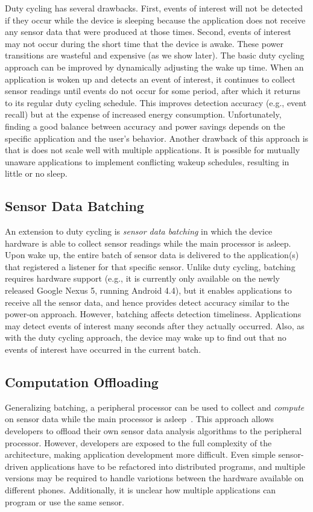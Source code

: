 Duty cycling has several drawbacks. First, events of interest will not be
detected if they occur while the device is sleeping because the application does
not receive any sensor data that were produced at those times. Second, events of
interest may not occur during the short time that the device is awake. These
power transitions are wasteful and expensive (as we show later). The basic duty
cycling approach can be improved by dynamically adjusting the wake up time. When
an application is woken up and detects an event of interest, it continues to
collect sensor readings until events do not occur for some period, after which
it returns to its regular duty cycling schedule. This improves detection
accuracy (e.g., event recall) but at the expense of increased energy
consumption. Unfortunately, finding a good balance between accuracy and power
savings depends on the specific application and the user's behavior. Another
drawback of this approach is that is does not scale well with multiple
applications. It is possible for mutually unaware applications to implement
conflicting wakeup schedules, resulting in little or no sleep.

\subsection{Sensor Data Batching}

An extension to duty cycling is \emph{sensor data batching} in which the device
hardware is able to collect sensor readings while the main processor is
asleep. Upon wake up, the entire batch of sensor data is delivered to the
application(s) that registered a listener for that specific sensor. Unlike duty
cycling, batching requires hardware support (e.g., it is currently only
available on the newly released Google Nexus 5, running Android 4.4), but it
enables applications to receive all the sensor data, and hence provides detect
accuracy similar to the power-on approach. However, batching affects detection
timeliness. Applications may detect events of interest many seconds after they
actually occurred. Also, as with the duty cycling approach, the device may wake
up to find out that no events of interest have occurred in the current batch.

\subsection{Computation Offloading}

Generalizing batching, a peripheral processor can be used to collect
and \emph{compute} on sensor data while the main processor is
asleep~\cite{reflex,turducken}.  This approach allows developers to
offload their own sensor data analysis algorithms to the peripheral
processor. However, developers are exposed to the full complexity of
the architecture, making application development more difficult. Even
simple sensor-driven applications have to be refactored into
distributed programs, and multiple versions may be required to handle
variotions between the hardware available on different phones.
Additionally, it is unclear how multiple applications can program or
use the same sensor.

